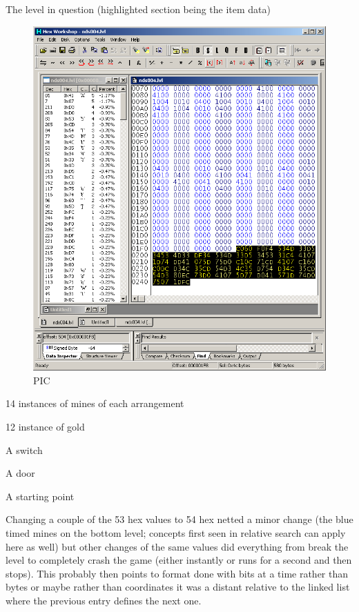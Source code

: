 \documentclass[
]{book}
\begin{document}
The level in question (highlighted section being the item data)

\begin{figure}
\centering
\includegraphics{images/180_home_fast6191_romhackingguide_unrenamed_fil___rs_romhackingguideleveleditingworkedNplus13.png}
\caption{PIC}
\end{figure}

14 instances of mines of each arrangement

12 instance of gold

A switch

A door

A starting point

Changing a couple of the 53 hex values to 54 hex netted a minor change (the blue timed mines on the bottom level; concepts first seen in relative search can apply here as well) but other changes of the same values did everything from break the level to completely crash the game (either instantly or runs for a second and then stops). This probably then points to format done with bits at a time rather than bytes or maybe rather than coordinates it was a distant relative to the linked list where the previous entry defines the next one.
\end{document}
